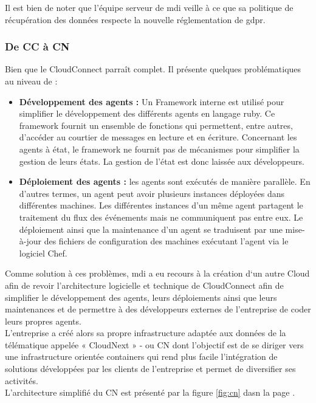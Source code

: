         Il est bien de noter que l'équipe serveur de \gls{mdi} veille à ce que sa politique de récupération des données 
        respecte la nouvelle réglementation de \gls{gdpr}\cite{gdpr}. 
      
    
    \subsubsection{De \gls{CC} à \gls{CN}}

       Bien que le CloudConnect parraît complet. Il présente quelques problématiques au niveau de : 
       \begin{itemize}
        \renewcommand{\labelitemi}{$\bullet$}
            \item \textbf{Développement des agents :} Un Framework interne est utilisé pour simplifier le développement des différents 
        agents en langage ruby. Ce framework fournit un ensemble de fonctions qui permettent, entre autres, d’accéder au 
        courtier de messages en lecture et en écriture. Concernant les agents à état, le framework ne fournit pas 
        de mécanismes pour simplifier la gestion de leurs états. La gestion de l’état est donc laissée aux développeurs.\\[0.3cm]
            \item \textbf{Déploiement des agents :} les agents sont exécutés de manière parallèle. En d’autres termes, un agent peut avoir 
        plusieurs instances déployées dans différentes machines. Les différentes instances d’un même agent partagent 
        le traitement du flux des événements mais ne communiquent pas entre eux. Le déploiement ainsi que la maintenance 
        d’un agent se traduisent par une mise-à-jour des fichiers de configuration des machines exécutant l’agent via le logiciel Chef.\\ [0.3cm]
    \end{itemize}

         Comme solution à ces problèmes, \gls{mdi} a eu recours à la création d‘un autre Cloud afin de revoir l’architecture 
        logicielle et technique de CloudConnect afin de simplifier le développement des agents, leurs déploiements 
        ainsi que leurs maintenances et de permettre à des développeurs externes de l’entreprise de coder leurs propres agents.\\
        L'entreprise a créé alors sa propre infrastructure adaptée aux données de la télématique appelée « CloudNext » - ou  \gls{CN} 
        dont l’objectif est de se diriger vers une infrastructure orientée containers qui rend plus facile l’intégration de 
        solutions développées par les clients de l’entreprise et permet de diversifier ses activités.\\ [0.3cm] 
        L'architecture simplifié du \gls{CN} est présenté par la figure \ref{fig:cn} dasn la page \pageref{fig:cn}.



